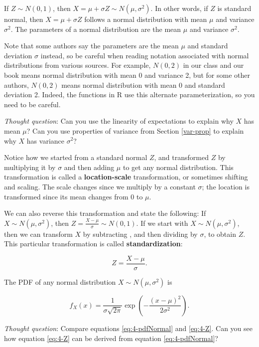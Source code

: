 \documentclass[
]{book}
\begin{document}
If \(Z \sim N(0,1)\), then \(X = \mu + \sigma Z \sim N(\mu, \sigma^2)\). In other words, if \(Z\) is standard normal, then \(X = \mu + \sigma Z\) follows a normal distribution with mean \(\mu\) and variance \(\sigma^2\). The parameters of a normal distribution are the mean \(\mu\) and variance \(\sigma^2\).

Note that some authors say the parameters are the mean \(\mu\) and standard deviation \(\sigma\) instead, so be careful when reading notation associated with normal distributions from various sources. For example, \(N(0,2)\) in our class and our book means normal distribution with mean 0 and variance 2, but for some other authors, \(N(0,2)\) means normal distribution with mean 0 and standard deviation 2. Indeed, the functions in R use this alternate parameterization, so you need to be careful.

\emph{Thought question}: Can you use the linearity of expectations to explain why \(X\) has mean \(\mu\)? Can you use properties of variance from Section \ref{var-prop} to explain why \(X\) has variance \(\sigma^2\)?

Notice how we started from a standard normal \(Z\), and transformed \(Z\) by multiplying it by \(\sigma\) and then adding \(\mu\) to get any normal distribution. This transformation is called a \textbf{location-scale} transformation, or sometimes shifting and scaling. The scale changes since we multiply by a constant \(\sigma\); the location is transformed since its mean changes from 0 to \(\mu\).

We can also reverse this transformation and state the following: If \(X \sim N(\mu, \sigma^2)\), then \(Z = \frac{X-\mu}{\sigma} \sim N(0,1)\). If we start with \(X \sim N(\mu, \sigma^2)\), then we can transform \(X\) by subtracting \mu, and then dividing by \(\sigma\), to obtain \(Z\). This particular transformation is called \textbf{standardization}:

\begin{equation} 
Z = \frac{X-\mu}{\sigma}.
\label{eq:4-standardize}
\end{equation}

The PDF of any normal distribution \(X \sim N(\mu, \sigma^2)\) is

\begin{equation} 
f_X(x) = \frac{1}{\sigma \sqrt{2 \pi}} \exp \left(-\frac{(x - \mu)^2}{2 \sigma^2} \right).
\label{eq:4-pdfNormal}
\end{equation}

\emph{Thought question}: Compare equations \eqref{eq:4-pdfNormal} and \eqref{eq:4-Z}. Can you see how equation \eqref{eq:4-Z} can be derived from equation \eqref{eq:4-pdfNormal}?
\end{document}
